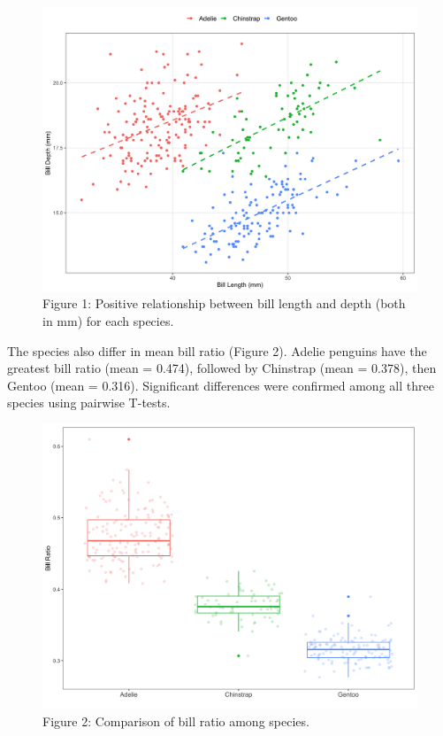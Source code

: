 \documentclass[
]{article}
\begin{document}
\begin{figure}
\centering
\includegraphics{images/figure1.png}
\caption{Figure 1: Positive relationship between bill length and depth
(both in mm) for each species.}
\end{figure}

The species also differ in mean bill ratio (Figure 2). Adelie penguins
have the greatest bill ratio (mean = 0.474), followed by Chinstrap (mean
= 0.378), then Gentoo (mean = 0.316). Significant differences were
confirmed among all three species using pairwise T-tests.

\begin{figure}
\centering
\includegraphics{images/figure2.png}
\caption{Figure 2: Comparison of bill ratio among species.}
\end{figure}
\end{document}
